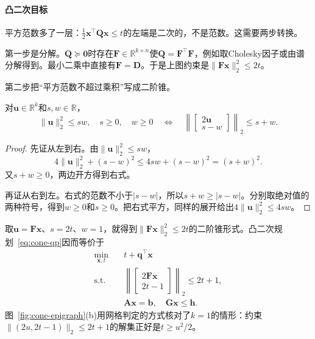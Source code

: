 \paragraph{凸二次目标}
平方范数多了一层：$\frac12\bm{x}^\top\bm{Q}\bm{x}\leq t$的左端是二次的，不是范数。这需要两步转换。

第一步是分解。$\bm{Q}\succeq\bm{0}$时存在$\bm{F}\in\mathbb{R}^{k\times n}$使$\bm{Q}=\bm{F}^\top\bm{F}$，例如取Cholesky因子或由谱分解得到。最小二乘中直接有$\bm{F}=\bm{D}$。于是上图约束是$\lVert\bm{F}\bm{x}\rVert_2^2\leq2t$。

第二步把“平方范数不超过乘积”写成二阶锥。

\begin{lemma}[旋转二阶锥]
\label{lem:cone-rotated-soc}
对$\bm{u}\in\mathbb{R}^k$和$s,w\in\mathbb{R}$，
\begin{equation}
 \lVert\bm{u}\rVert_2^2\leq sw,\quad s\geq0,\quad w\geq0
 \quad\Longleftrightarrow\quad
 \left\lVert\begin{bmatrix}2\bm{u}\\s-w\end{bmatrix}\right\rVert_2\leq s+w.
 \label{eq:cone-rotated-soc}
\end{equation}
\end{lemma}

\begin{proof}
先证从左到右。由$\lVert\bm{u}\rVert_2^2\leq sw$，
\[
 4\lVert\bm{u}\rVert_2^2+(s-w)^2\leq4sw+(s-w)^2=(s+w)^2.
\]
又$s+w\geq0$，两边开方得到右式。

再证从右到左。右式的范数不小于$\lvert s-w\rvert$，所以$s+w\geq\lvert s-w\rvert$。分别取绝对值的两种符号，得到$w\geq0$和$s\geq0$。把右式平方，同样的展开给出$4\lVert\bm{u}\rVert_2^2\leq4sw$。
\end{proof}

取$\bm{u}=\bm{F}\bm{x}$、$s=2t$、$w=1$，就得到$\lVert\bm{F}\bm{x}\rVert_2^2\leq2t$的二阶锥形式。凸二次规划~\eqref{eq:cone-qp}因而等价于
\begin{equation}
 \begin{aligned}
 \min_{\bm{x},t}\quad&t+\bm{q}^\top\bm{x}\\
 \text{s.t.}\quad&\left\lVert\begin{bmatrix}2\bm{F}\bm{x}\\2t-1\end{bmatrix}\right\rVert_2\leq2t+1,\\
 &\bm{A}\bm{x}=\bm{b},\quad\bm{G}\bm{x}\leq\bm{h}.
 \end{aligned}
 \label{eq:cone-qp-socp}
\end{equation}
图~\ref{fig:cone-epigraph}(b)用网格判定的方式核对了$k=1$的情形：约束$\lVert(2u,2t-1)\rVert_2\leq2t+1$的解集正好是$t\geq u^2/2$。

